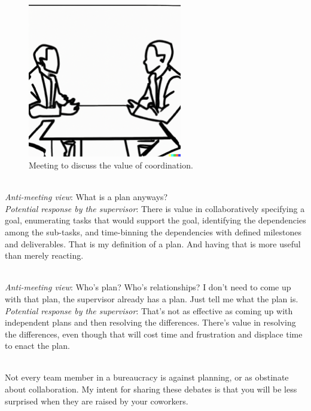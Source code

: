\begin{figure}[H]
    \centering
\includegraphics[width=0.6\textwidth]{images/confrontational meeting of two people in a conference room both are seated.pdf}
    \caption{Meeting to discuss the value of coordination.}
    \label{fig:meeting-to-discuss-coordination}
\end{figure}


\ \\
\textit{Anti-meeting view}: What is a plan anyways?\\
\textit{Potential response by the supervisor}: There is value in collaboratively specifying a goal, enumerating tasks that would support the goal, identifying the dependencies among the sub-tasks, and time-binning the dependencies with defined milestones and deliverables. That is my definition of a plan. And having that is more useful than merely reacting.

\ \\
\textit{Anti-meeting view}: Who's plan? Who's relationships? I don't need to come up with that plan, the supervisor already has a plan. Just tell me what the plan is.\\
\textit{Potential response by the supervisor}: That's not as effective as coming up with independent plans and then resolving the differences. There's value in resolving the differences, even though that will cost time and frustration and displace time to enact the plan.


\ \\

Not every team member in a bureaucracy is against planning, or as obstinate about collaboration. 
My intent for sharing these debates is that you will be less surprised when they are raised by your coworkers. 
